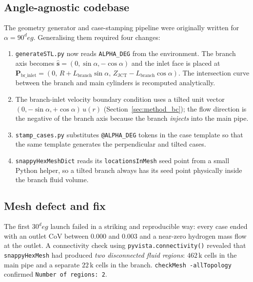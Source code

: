 \documentclass[11pt,a4paper]{article}
\def\CoV{CoV}%
\def\circ{ deg}%
\newcommand{\CoV}{\ensuremath{\mathrm{CoV}}}
\begin{document}
\subsection{Angle-agnostic codebase}
\label{sec:30_code}
The geometry generator and case-stamping pipeline were originally
written for \(\alpha=90^\circ\). Generalising them required four
changes:
\begin{enumerate}
    \item \texttt{generateSTL.py} now reads \texttt{ALPHA\_DEG} from
    the environment. The branch axis becomes
    \(\hat{\mathbf{s}}=(0,\sin\alpha,-\cos\alpha)\) and the inlet
    face is placed at
    \(\mathbf{P}_{\mathrm{br\_inlet}}=(0,\,R + L_{\mathrm{branch}}
    \sin\alpha,\,Z_{\mathrm{JCT}} - L_{\mathrm{branch}}\cos\alpha)\).
    The intersection curve between the branch and main cylinders is
    recomputed analytically.
    \item The branch-inlet velocity boundary condition uses a
    tilted unit vector \((0,-\sin\alpha,+\cos\alpha)\,u(r)\)
    (Section~\ref{sec:method_bc}); the flow direction is the
    negative of the branch axis because the branch \emph{injects}
    into the main pipe.
    \item \texttt{stamp\_cases.py} substitutes \texttt{@ALPHA\_DEG}
    tokens in the case template so that the same template generates
    the perpendicular and tilted cases.
    \item \texttt{snappyHexMeshDict} reads its \texttt{locationsInMesh}
    seed point from a small Python helper, so a tilted branch always
    has its seed point physically inside the branch fluid volume.
\end{enumerate}

\subsection{Mesh defect and fix}
\label{sec:30deg_meshfix}
The first \(30^\circ\) launch failed in a striking and reproducible
way: every case ended with an outlet \CoV{} between \(0.000\) and
\(0.003\) and a near-zero hydrogen mass flow at the outlet. A
connectivity check using \texttt{pyvista.connectivity()} revealed
that \texttt{snappyHexMesh} had produced \emph{two disconnected
fluid regions}: \(462\,\mathrm{k}\) cells in the main pipe and a
separate \(22\,\mathrm{k}\) cells in the branch.
\texttt{checkMesh -allTopology} confirmed
\texttt{Number of regions: 2}.
\end{document}
